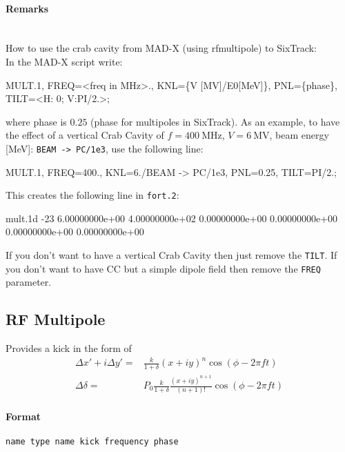 \paragraph{Remarks}~\\

\noindent How to use the crab cavity from MAD-X (using rfmultipole) to SixTrack:\\
\bigskip
\noindent In the MAD-X script write:
\begin{cverbatim}
MULT.1, FREQ=<freq in MHz>., KNL=\{V [MV]/E0[MeV]\}, PNL=\{phase\}, TILT=<H: 0; V:PI/2.>;
\end{cverbatim}
where phase is $0.25$ (phase for multipoles in SixTrack).
As an example, to have the effect of a vertical Crab Cavity of $f=400~\mathrm{MHz}$, $V=6~\mathrm{MV}$, beam energy [MeV]: \texttt{BEAM -> PC/1e3}, use the following line:\\
\begin{cverbatim}
MULT.1, FREQ=400., KNL={6./BEAM -> PC/1e3}, PNL={0.25}, TILT=PI/2.;
\end{cverbatim}
This creates the following line in \texttt{fort.2}:
\begin{cverbatim}
mult.1d  -23  6.00000000e+00  4.00000000e+02  0.00000000e+00  0.00000000e+00  0.00000000e+00  0.00000000e+00
\end{cverbatim}
If you don’t want to have a vertical Crab Cavity then just remove the \texttt{TILT}.
If you don’t want to have CC but a simple dipole field then remove the \texttt{FREQ} parameter.

\subsection{RF Multipole}

Provides a kick in the form of
\begin{align}
    \Delta x'+i\Delta y' =& \frac{k}{1+\delta} (x+iy)^n \cos (\phi - 2 \pi f t) \\
    \Delta \delta =& P_0 \frac{k}{1+\delta} \frac{(x+iy)^{n+1}}{(n+1)!} \cos (\phi - 2 \pi f t)
\end{align}

\paragraph{Format} \texttt{name type name kick frequency phase}

